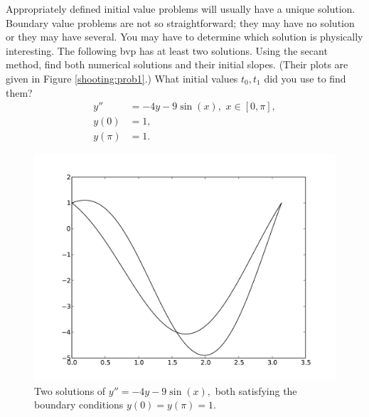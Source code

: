 

\begin{problem} Appropriately defined initial value problems will usually have a unique solution. Boundary value problems are not so straightforward; they may have no solution or they may have several. You may have to determine which solution is physically interesting. The following bvp has at least two solutions. Using the secant method, find both numerical solutions and their initial slopes. (Their plots are given in Figure \eqref{shooting:prob1}.) What initial values $t_0, t_1$ did you use to find them?
\begin{equation*}
\begin{split}
y'' &= -4y -9\sin(x), \,\, x \in [0,\pi],\\
y(0) &= 1, \\
y(\pi) &=1.
\end{split}
\end{equation*}
\end{problem}

\begin{figure}[ht]
\centering
\includegraphics[width=\textwidth]{Fig1.pdf}
\caption{Two solutions of $y'' = -4y -9\sin(x),$ both satisfying the boundary conditions $y(0) = y(\pi) = 1.$}
\label{shooting:prob1}
\end{figure}

